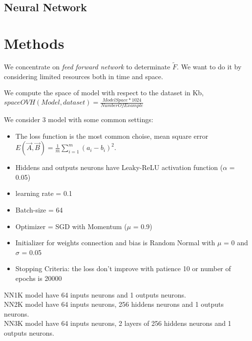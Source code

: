 \documentclass[]{article}
\begin{document}
	\subsection{Neural Network}
	
	\section{Methods}
	We concentrate on \textit{feed forward  network} to determinate $\tilde{F}$. We want to do it by considering limited resources both in time and space.
	
	We compute the space of model with respect to the dataset in Kb,\\ $spaceOVH(Model, dataset) = \frac{ModelSpace*1024}{NumberOfExample}$
	
	We consider 3 model with some common settings:
	\begin{itemize}
		\item The loss function is the most common choise, mean square error $E(\vec{A}, \vec{B}) = \frac{1}{m} \sum_{i=1}^{m}(a_{i} - b_{i})^{2} $.
		\item Hiddens and outputs neurons have Leaky-ReLU activation function ($\alpha$ = 0.05)
		\item learning rate = 0.1
		\item Batch-size = 64
		\item Optimizer = SGD with Momentum ($\mu$ = 0.9)
		\item Initializer for weights connection and bias is Random Normal with $\mu$ = 0 and $\sigma$ = 0.05
		\item Stopping Criteria: the loss don't improve with patience 10 or number of epochs is 20000
	\end{itemize}
	NN1K model have 64 inputs neurons and 1 outputs neurons. \\
	NN2K model have 64 inputs neurons, 256 hiddens neurons and 1 outputs neurons.\\
	NN3K model have 64 inputs neurons, 2 layers of 256 hiddens neurons and 1 outputs neurons.
	
\end{document}
